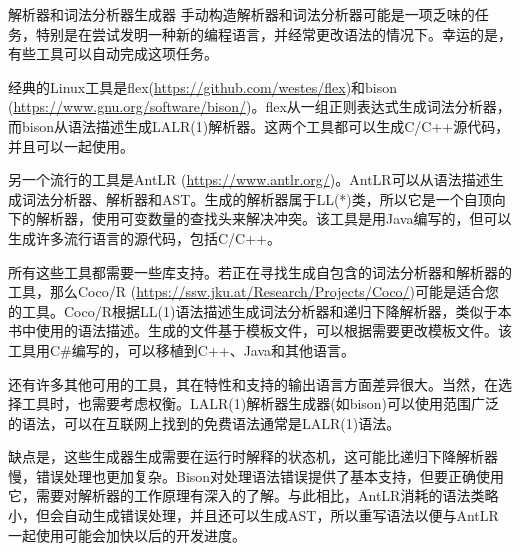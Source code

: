 \begin{myTip}{解析器和词法分析器生成器}
手动构造解析器和词法分析器可能是一项乏味的任务，特别是在尝试发明一种新的编程语言，并经常更改语法的情况下。幸运的是，有些工具可以自动完成这项任务。

经典的Linux工具是flex(\url{https://github.com/westes/flex})和bison (\url{https://www.gnu.org/software/bison/})。flex从一组正则表达式生成词法分析器，而bison从语法描述生成LALR(1)解析器。这两个工具都可以生成C/C++源代码，并且可以一起使用。

另一个流行的工具是AntLR (\url{https://www.antlr.org/})。AntLR可以从语法描述生成词法分析器、解析器和AST。生成的解析器属于LL(*)类，所以它是一个自顶向下的解析器，使用可变数量的查找头来解决冲突。该工具是用Java编写的，但可以生成许多流行语言的源代码，包括C/C++。

所有这些工具都需要一些库支持。若正在寻找生成自包含的词法分析器和解析器的工具，那么Coco/R (\url{https://ssw.jku.at/Research/Projects/Coco/})可能是适合您的工具。Coco/R根据LL(1)语法描述生成词法分析器和递归下降解析器，类似于本书中使用的语法描述。生成的文件基于模板文件，可以根据需要更改模板文件。该工具用C\#编写的，可以移植到C++、Java和其他语言。

还有许多其他可用的工具，其在特性和支持的输出语言方面差异很大。当然，在选择工具时，也需要考虑权衡。LALR(1)解析器生成器(如bison)可以使用范围广泛的语法，可以在互联网上找到的免费语法通常是LALR(1)语法。

缺点是，这些生成器生成需要在运行时解释的状态机，这可能比递归下降解析器慢，错误处理也更加复杂。Bison对处理语法错误提供了基本支持，但要正确使用它，需要对解析器的工作原理有深入的了解。与此相比，AntLR消耗的语法类略小，但会自动生成错误处理，并且还可以生成AST，所以重写语法以便与AntLR一起使用可能会加快以后的开发进度。
\end{myTip}
















































